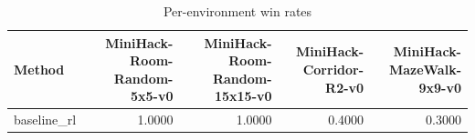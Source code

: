 \begin{table}[htbp]
\centering
\caption{Per-environment win rates}
\label{tab:per-env}
\begin{tabular}{lrrrr}
\toprule
\textbf{Method} & \textbf{MiniHack-Room-Random-5x5-v0} & \textbf{MiniHack-Room-Random-15x15-v0} & \textbf{MiniHack-Corridor-R2-v0} & \textbf{MiniHack-MazeWalk-9x9-v0} \\
\midrule
baseline\_rl & 1.0000 & 1.0000 & 0.4000 & 0.3000 \\
\bottomrule
\end{tabular}
\end{table}